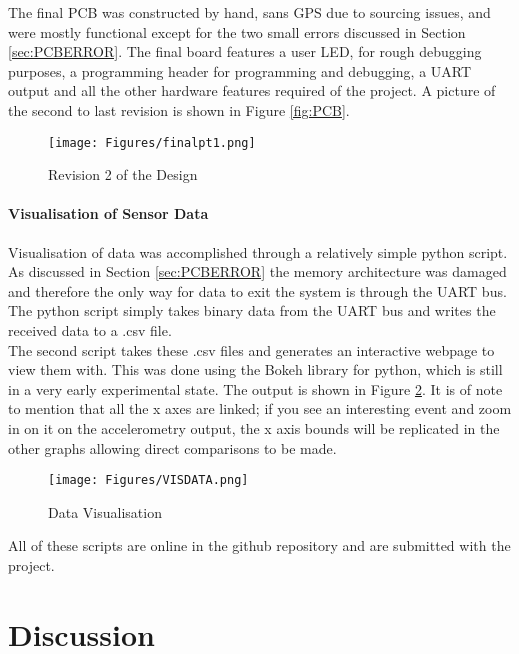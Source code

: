 \documentclass[12pt,openany,a4paper]{book}
\begin{document}
	The final PCB was constructed by hand, sans GPS due to sourcing issues, and were mostly functional except for the two small errors discussed in Section \ref{sec:PCBERROR}. The final board features a user LED, for rough debugging purposes, a programming header for programming and debugging, a UART output and all the other hardware features required of the project. A picture of the second to last revision is shown in Figure \ref{fig:PCB}.
	
	
		\begin{figure}[H]
			\centering
			\texttt{[image: Figures/finalpt1.png]}
			\caption{Revision 2 of the Design}
			\label{fig:FIN}
		\end{figure}	

	\newpage
	\subsubsection{Visualisation of Sensor Data}
		Visualisation of data was accomplished through a relatively simple python script. As discussed in Section \ref{sec:PCBERROR} the memory architecture was damaged and therefore the only way for data to exit the system is through the UART bus. The python script simply takes binary data from the UART bus and writes the received data to a .csv file. \\
		
		The second script takes these .csv files and generates an interactive webpage to view them with. This was done using the Bokeh library for python, which is still in a very early experimental state. The output is shown in Figure \ref{fig:VISDATA}. It is of note to mention that all the x axes are linked; if you see an interesting event and zoom in on it on the accelerometry output, the x axis bounds will be replicated in the other graphs allowing direct comparisons to be made.
		
				\begin{figure}[H]
					\centering
					\texttt{[image: Figures/VISDATA.png]}
					\caption{Data Visualisation}
					\label{fig:VISDATA}
				\end{figure}
		
		All of these scripts are online in the github repository and are submitted with the project.
		
\chapter{Discussion}
\end{document}
